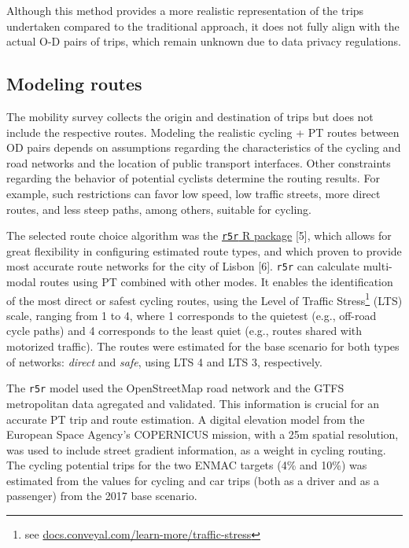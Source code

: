 \documentclass[runningheads]{llncs}
\begin{document}
Although this method provides a more realistic representation of the
trips undertaken compared to the traditional approach, it does not fully
align with the actual O-D pairs of trips, which remain unknown due to
data privacy regulations.

\hypertarget{modeling-routes}{%
\subsection{Modeling routes}\label{modeling-routes}}

The mobility survey collects the origin and destination of trips but
does not include the respective routes. Modeling the realistic cycling +
PT routes between OD pairs depends on assumptions regarding the
characteristics of the cycling and road networks and the location of
public transport interfaces. Other constraints regarding the behavior of
potential cyclists determine the routing results. For example, such
restrictions can favor low speed, low traffic streets, more direct
routes, and less steep paths, among others, suitable for cycling.

The selected route choice algorithm was the
\href{https://ipeagit.github.io/r5r/}{\texttt{r5r} R package} {[}5{]},
which allows for great flexibility in configuring estimated route types,
and which proven to provide most accurate route networks for the city of
Lisbon {[}6{]}. \texttt{r5r} can calculate multi-modal routes using PT
combined with other modes. It enables the identification of the most
direct or safest cycling routes, using the Level of Traffic
Stress\footnote{see
  \href{https://docs.conveyal.com/learn-more/traffic-stress}{docs.conveyal.com/learn-more/traffic-stress}}
(LTS) scale, ranging from 1 to 4, where 1 corresponds to the quietest
(e.g., off-road cycle paths) and 4 corresponds to the least quiet (e.g.,
routes shared with motorized traffic). The routes were estimated for the
base scenario for both types of networks: \emph{direct} and \emph{safe},
using LTS 4 and LTS 3, respectively.

The \texttt{r5r} model used the OpenStreetMap road network and the GTFS
metropolitan data agregated and validated. This information is crucial
for an accurate PT trip and route estimation. A digital elevation model
from the European Space Agency's COPERNICUS mission, with a 25m spatial
resolution, was used to include street gradient information, as a weight
in cycling routing. The cycling potential trips for the two ENMAC
targets (4\% and 10\%) was estimated from the values for cycling and car
trips (both as a driver and as a passenger) from the 2017 base scenario.
\end{document}
